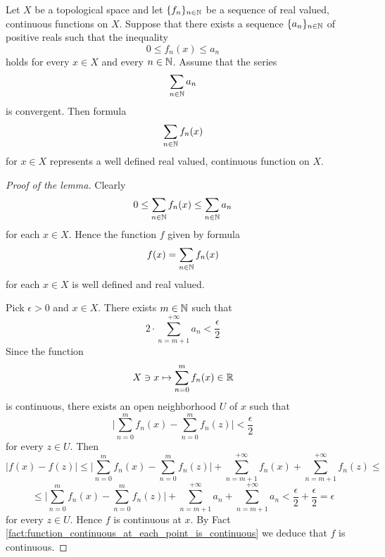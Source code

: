\begin{lemma}\label{lemma:Weierstrass_criterion}
	Let $X$ be a topological space and let $\{f_n\}_{n\in {\mathbb N}}$ be a sequence of real valued, continuous functions on $X$. Suppose that there exists a sequence $\{a_n\}_{n \in {\mathbb N}}$ of positive reals such that the inequality
	$$0 \leq f_n(x) \leq a_n$$
	holds for every $x \in X$ and every $n \in {\mathbb N}$. Assume that the series
	$$\sum_{n \in {\mathbb N}}a_n$$
	is convergent. Then formula
	$$\sum_{n\in {\mathbb N}}f_n(x)$$
	for $x \in X$ represents a well defined real valued, continuous function on $X$.
\end{lemma}
\begin{proof}[Proof of the lemma]
	Clearly
	$$0 \leq \sum_{n\in {\mathbb N}}f_n(x) \leq \sum_{n\in {\mathbb N}}a_n$$
	for each $x \in X$. Hence the function $f$ given by formula
	$$f(x) = \sum_{n \in {\mathbb N}}f_n(x)$$
	for each $x \in X$ is well defined and real valued.

	Pick $\epsilon > 0$ and $x \in X$. There exists $m \in {\mathbb N}$ such that
	$$2 \cdot \sum_{n=m + 1}^{+\infty}a_n < \frac{\epsilon}{2}$$
	Since the function
	$$X\ni x \mapsto \sum_{n=0}^mf_n(x) \in {\mathbb R}$$
	is continuous, there exists an open neighborhood $U$ of $x$ such that
	$$\bigg|\sum_{n=0}^mf_n(x) - \sum_{n=0}^mf_n(z)\bigg| < \frac{\epsilon}{2}$$
	for every $z \in U$. Then
	$$|f(x) - f(z)| \leq \bigg|\sum_{n=0}^mf_n(x) - \sum_{n=0}^mf_n(z)\bigg| + \sum_{n=m+1}^{+\infty}f_n(x) + \sum_{n=m+1}^{+\infty}f_n(z) \leq $$
	$$\leq \bigg|\sum_{n=0}^mf_n(x) - \sum_{n=0}^mf_n(z)\bigg| + \sum_{n=m+1}^{+\infty}a_n + \sum_{n=m+1}^{+\infty}a_n < \frac{\epsilon}{2} + \frac{\epsilon}{2} = \epsilon$$
	for every $z \in U$. Hence $f$ is continuous at $x$. By Fact \ref{fact:function_continuous_at_each_point_is_continuous} we deduce that $f$ is continuous.
\end{proof}

